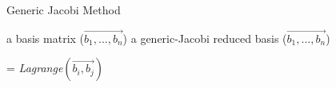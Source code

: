 \begin{algorithm}[H]
\caption{Generic Jacobi Method}
\label{genericJacobiMethod}
\begin{algorithmic}
\REQUIRE a basis matrix ($\vec{b_1,...,b_n}$)
\ENSURE a generic-Jacobi reduced basis ($\vec{b_1,...,b_n}$)

            \STATE {$[\vec{b_i, b_j}]$} = \emph{Lagrange$(\vec{b_i, b_j})$}
        \ENDFOR
    \ENDFOR
\ENDWHILE

\end{algorithmic}
\end{algorithm}